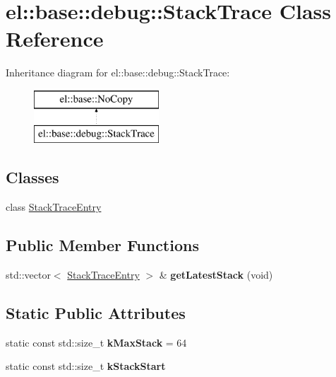 \hypertarget{classel_1_1base_1_1debug_1_1StackTrace}{\section{el\-:\-:base\-:\-:debug\-:\-:Stack\-Trace Class Reference}
\label{classel_1_1base_1_1debug_1_1StackTrace}
}
Inheritance diagram for el\-:\-:base\-:\-:debug\-:\-:Stack\-Trace\-:\begin{figure}[H]
\begin{center}
\leavevmode
\includegraphics[height=2.000000cm]{classel_1_1base_1_1debug_1_1StackTrace}
\end{center}
\end{figure}
\subsection*{Classes}
\begin{DoxyCompactItemize}
\item 
class \hyperlink{classel_1_1base_1_1debug_1_1StackTrace_1_1StackTraceEntry}{Stack\-Trace\-Entry}
\end{DoxyCompactItemize}
\subsection*{Public Member Functions}
\begin{DoxyCompactItemize}
\item 
\hypertarget{classel_1_1base_1_1debug_1_1StackTrace_a8b6a4f154b59d597b73fe8a515df3240}{std\-::vector$<$ \hyperlink{classel_1_1base_1_1debug_1_1StackTrace_1_1StackTraceEntry}{Stack\-Trace\-Entry} $>$ \& {\bfseries get\-Latest\-Stack} (void)}\label{classel_1_1base_1_1debug_1_1StackTrace_a8b6a4f154b59d597b73fe8a515df3240}

\end{DoxyCompactItemize}
\subsection*{Static Public Attributes}
\begin{DoxyCompactItemize}
\item 
\hypertarget{classel_1_1base_1_1debug_1_1StackTrace_a6e3db7fdc258a7d653f00fc5aade55c2}{static const std\-::size\-\_\-t {\bfseries k\-Max\-Stack} = 64}\label{classel_1_1base_1_1debug_1_1StackTrace_a6e3db7fdc258a7d653f00fc5aade55c2}

\item 
static const std\-::size\-\_\-t {\bfseries k\-Stack\-Start}
\end{DoxyCompactItemize}
